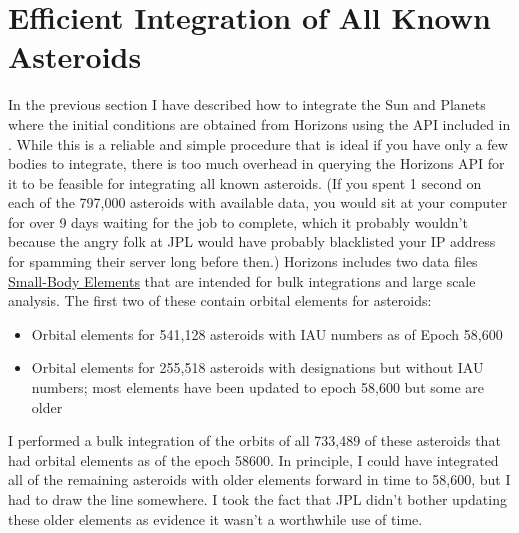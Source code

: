 \section{Efficient Integration of All Known Asteroids}
\label{section_integrate_known_asteroids}
In the previous section I have described how to integrate the Sun and Planets where the initial conditions
are obtained from Horizons using the API included in .
While this is a reliable and simple procedure that is ideal if you have only a few bodies to integrate,
there is too much overhead in querying the Horizons API for it to be feasible for integrating all known asteroids.
(If you spent 1 second on each of the 797,000 asteroids with available data, 
you would sit at your computer for over 9 days waiting for the job to complete,
which it probably wouldn't because the angry folk at JPL would have probably blacklisted your IP address
for spamming their server long before then.)
Horizons includes two data files \href{https://ssd.jpl.nasa.gov/?sb_elem}{Small-Body Elements}
that are intended for bulk integrations and large scale analysis.
The first two of these contain orbital elements for asteroids:
\begin{itemize}
\item Orbital elements for 541,128 asteroids with IAU numbers as of Epoch 58,600
\item Orbital elements for 255,518 asteroids with designations but without IAU numbers; most elements have been updated to epoch 58,600 but some are older
\end{itemize}
I performed a bulk integration of the orbits of all 733,489 of these asteroids that had orbital elements as of the epoch 58600.
In principle, I could have integrated all of the remaining asteroids with older elements forward in time to 58,600, but I had to draw the line somewhere.
I took the fact that JPL didn't bother updating these older elements as evidence it wasn't a worthwhile use of time.


